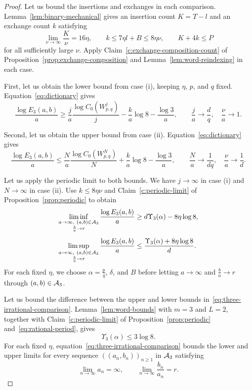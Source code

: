 \begin{proof}
Let us bound the insertions and exchanges in each comparison.
Lemma~\ref{lem:binary-mechanical} gives an insertion count $K=T-l$ and an exchange count $k$ satisfying
\[
 \lim_{\nu\to\infty}\frac K\nu=16\eta,\qquad k\le7\eta l+B\le8\eta\nu,
 \qquad K+4k\le P
\]
for all sufficiently large $\nu$.
Apply Claim~\ref{c:exchange-composition-count} of Proposition~\ref{prop:exchange-composition} and Lemma~\ref{lem:word-reindexing} in each case.

First, let us obtain the lower bound from case (i), keeping $\eta$, $p$, and $q$ fixed.
Equation~\eqref{eq:dictionary} gives
\[
 \frac{\log E_3(a,b)}a
 \ge\frac ja\frac{\log C_0(W_{p,q}^j)}j
       -\frac ka\log8-\frac{\log3}a,
 \qquad
 \frac ja\longrightarrow\frac dq,\quad \frac\nu a\longrightarrow1.
\]

Second, let us obtain the upper bound from case (ii).
Equation~\eqref{eq:dictionary} gives
\[
 \frac{\log E_3(a,b)}a
 \le\frac Na\frac{\log C_0(W_{p,q}^N)}N
       +\frac ka\log8-\frac{\log3}a,
 \qquad
 \frac Na\longrightarrow\frac1{dq},\quad \frac\nu a\longrightarrow\frac1d.
\]

Let us apply the periodic limit to both bounds.
We have $j\to\infty$ in case (i) and $N\to\infty$ in case (ii).
Use $k\le8\eta\nu$ and Claim~\ref{c:periodic-limit} of Proposition~\ref{prop:periodic} to obtain
\begin{equation}\label{eq:three-irrational-comparison}
 \begin{aligned}
 \liminf_{\substack{a\to\infty,\ (a,b)\in\mathcal A_3\\\frac{b}{a}\to r}}
 \frac{\log E_3(a,b)}a
 &\ge d\Upsilon_3(\alpha)-8\eta\log8,\\[1ex]
 \limsup_{\substack{a\to\infty,\ (a,b)\in\mathcal A_3\\\frac{b}{a}\to r}}
 \frac{\log E_3(a,b)}a
  &\le\frac{\Upsilon_3(\alpha)+8\eta\log8}{d}.
 \end{aligned}
\end{equation}
For each fixed $\eta$, we choose $\alpha=\frac{p}{q}$, $\delta$, and $B$
before letting $a\to\infty$ and $\frac ba\to r$ through $(a,b)\in\mathcal A_3$.

Let us bound the difference between the upper and lower bounds in~\eqref{eq:three-irrational-comparison}. Lemma~\ref{lem:word-bounds} with $m=3$ and $L=2$, together with Claim~\ref{c:periodic-limit} of Proposition~\ref{prop:periodic} and~\eqref{eq:rational-period}, gives
\[
 \Upsilon_3(\alpha)\le3\log8.
\]
For each fixed $\eta$, equation~\eqref{eq:three-irrational-comparison} bounds the lower and upper limits for every sequence $((a_n,b_n))_{n\ge1}$ in $\mathcal A_3$ satisfying
\[
 \lim_{n\to\infty}a_n=\infty,\qquad
 \lim_{n\to\infty}\frac{b_n}{a_n}=r.
\]


\end{proof}
